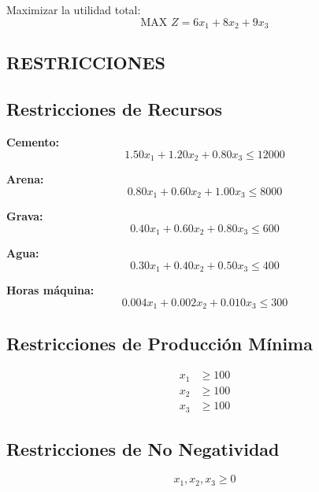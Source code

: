 \documentclass[12pt, a4paper, oneside]{book}
\theoremstyle{definition}
\begin{document}
Maximizar la utilidad total:
\begin{equation}
\text{MAX } Z = 6x_1 + 8x_2 + 9x_3
\end{equation}

\subsection{RESTRICCIONES}

\subsection{Restricciones de Recursos}

\textbf{Cemento:}
\begin{equation}
1.50x_1 + 1.20x_2 + 0.80x_3 \leq 12000
\end{equation}

\textbf{Arena:}
\begin{equation}
0.80x_1 + 0.60x_2 + 1.00x_3 \leq 8000
\end{equation}

\textbf{Grava:}
\begin{equation}
0.40x_1 + 0.60x_2 + 0.80x_3 \leq 600
\end{equation}

\textbf{Agua:}
\begin{equation}
0.30x_1 + 0.40x_2 + 0.50x_3 \leq 400
\end{equation}

\textbf{Horas máquina:}
\begin{equation}
0.004x_1 + 0.002x_2 + 0.010x_3 \leq 300
\end{equation}

\subsection{Restricciones de Producción Mínima}

\begin{align}
x_1 &\geq 100 \\
x_2 &\geq 100 \\
x_3 &\geq 100
\end{align}

\subsection{Restricciones de No Negatividad}

\begin{equation}
x_1, x_2, x_3 \geq 0
\end{equation}
\end{document}
